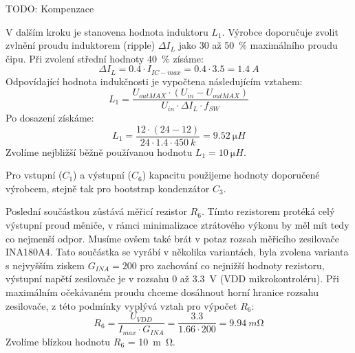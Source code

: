     TODO: Kompenzace

    V dalším kroku je stanovena hodnota induktoru \(L_{1} \). Výrobce doporučuje zvolit zvlnění proudu induktorem (ripple) \(\Delta I_{L}  \) jako 30 až \qty{50}{\percent} maximálního proudu čipu. Při zvolení střední hodnoty \qty{40}{\percent} zísáme:
    \begin{equation}
        \Delta I_{L} = \num{0.4}\cdot I_{IC-max} = \num{0.4} \cdot  \num{3.5} = \qty{1.4}{A}
    \end{equation}
    Odpovídající hodnota indukčnosti je vypočtena následujícím vztahem:
    \begin{equation}
        L_{1} = \frac{U_{outMAX}\cdot (U_{in} -U_{outMAX} ) }{U_{in} \cdot \Delta I_{L}\cdot f_{SW}  }
    \end{equation}
    Po dosazení získáme:
    \begin{equation}
        L_{1} = \frac{12\cdot (24 -12 ) }{24 \cdot \num{1.4}\cdot \qty{450}{k}  } = \qty{9.52}{\micro H}
    \end{equation}
    Zvolíme nejbližší běžně používanou hodnotu \(L_{1} = \qty{10}{\micro H}\).

    Pro vstupní (\(C_{1} \)) a výstupní (\(C_{6} \)) kapacitu použijeme hodnoty doporučené výrobcem, stejně tak pro bootstrap kondenzátor \(C_{3} \). 
    
    Poslední součástkou zůstává měřicí rezistor \(R_{6} \). Tímto rezistorem protéká celý výstupní proud měniče, v rámci minimalizace ztrátového výkonu by měl mít tedy co nejmenší odpor. Musíme ovšem také brát v potaz rozsah měřicího zesilovače INA180A4. Tato součástka se vyrábí v několika variantách, byla zvolena varianta s nejvyšším ziskem \(G_{INA}=200 \) pro zachování co nejnižší hodnoty rezistoru, výstupní napětí zesilovače je v rozsahu 0 až \qty{3.3}{V} (VDD mikrokontroléru).
    Při maximálním očekávaném proudu chceme dosáhnout horní hranice rozsahu zesilovače, z této podmínky vyplývá vztah pro výpočet \(R_{6} \):
    \begin{equation}
        R_{6} = \frac{U_{VDD}}{I_{max} \cdot G_{INA} } = \frac{\num{3.3}}{\num{1.66}\cdot 200} = \qty{9.94}{m\ohm}
    \end{equation} 
    Zvolíme blízkou hodnotu \(R_{6} \) = \qty{10}{m\ohm}.


